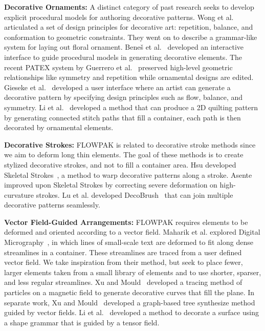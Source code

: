 \newtext
{
\textbf{Decorative Ornaments:} A distinct category of past research seeks to develop explicit procedural
models for authoring decorative patterns.  Wong et al.~\cite{Wong1998}
articulated a set of design principles for decorative art:
repetition, balance, and conformation to geometric constraints.  They
went on to describe a grammar-like system for laying out floral ornament.
Bene\v{s} et al.~\cite{Benes2011} developed an interactive 
interface to guide procedural models in generating decorative elements.
The recent PATEX system by Guerrero 
et al.~\cite{Guerrero2016} preserved high-level geometric relationships
like symmetry and repetition while ornamental designs are edited.
Gieseke et al.~\cite{Gieseke2017} developed a user interface where an artist 
can generate a decorative pattern by specifying design principles such as flow, balance, and symmetry.
Li et al.~\cite{Li2019} developed a method that can produce a 2D quilting pattern
by generating connected stitch paths that fill a container, 
each path is then decorated by ornamental elements.
}

\newtext
{
\textbf{Decorative Strokes:}
FLOWPAK is related to decorative stroke methods since we aim to deform long thin elements. 
The goal of these methods is to create stylized decorative strokes, and not to fill a container area. 
Hsu developed Skeletal Strokes~\cite{Hsu1993}, a method to warp decorative patterns along a stroke.
Asente~\cite{Asente2010} improved upon Skeletal Strokes by correcting severe deformation on high-curvature strokes.
Lu et al. developed DecoBrush~\cite{Lu2014} that can join multiple decorative patterns seamlessly.
}

\newtext
{
\textbf{Vector Field-Guided Arrangements:} 
FLOWPAK requires elements to be deformed and oriented according to a vector field.
Maharik et al. explored Digital Micrography~\cite{Maharik2011}, in which
lines of small-scale text are deformed to fit along dense streamlines in a container.
These streamlines are traced from a user defined vector field.
We take inspiration from their method, but seek to place fewer,
larger elements taken from a small library of elements and to use shorter, sparser, and less regular streamlines. 
Xu and Mould~\cite{Xu2009} developed a tracing method of particles on a magnetic field to
generate decorative curves that fill the plane.
In separate work, Xu and Mould~\cite{Xu2015} developed a graph-based tree synthesize method guided by vector fields.
Li et al.~\cite{Li2010} developed a method to decorate a surface using a shape grammar that is guided by a tensor field.
}

